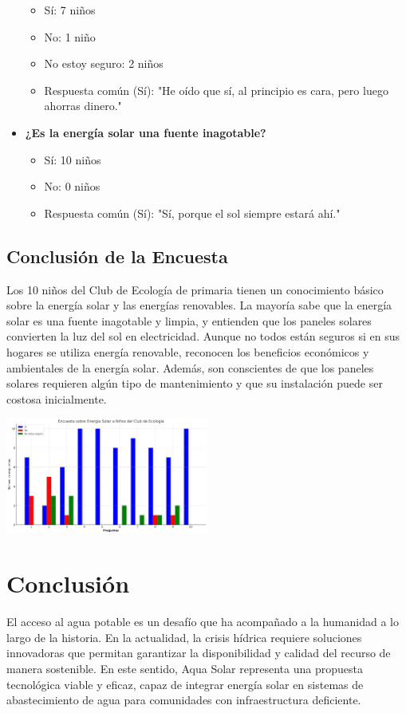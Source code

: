 \documentclass[12pt]{article}
\begin{document}
\begin{itemize}
            \begin{itemize}
                  \item Sí: 7 niños
                  \item No: 1 niño
                  \item No estoy seguro: 2 niños
                  \item Respuesta común (Sí): "He oído que sí, al principio es cara, pero luego ahorras dinero."
            \end{itemize}
      \item \textbf{¿Es la energía solar una fuente inagotable?}
            \begin{itemize}
                  \item Sí: 10 niños
                  \item No: 0 niños
                  \item Respuesta común (Sí): "Sí, porque el sol siempre estará ahí."
            \end{itemize}
\end{itemize}

\subsection{Conclusión de la Encuesta}
Los 10 niños del Club de Ecología de primaria tienen un conocimiento básico sobre la energía solar y las energías renovables. La mayoría sabe que la energía solar es una fuente inagotable y limpia, y entienden que los paneles solares convierten la luz del sol en electricidad. Aunque no todos están seguros si en sus hogares se utiliza energía renovable, reconocen los beneficios económicos y ambientales de la energía solar. Además, son conscientes de que los paneles solares requieren algún tipo de mantenimiento y que su instalación puede ser costosa inicialmente.




\begin{center}
      \includegraphics[width=0.5\textwidth]{imagenes/graph.png}
\end{center}
\newpage
\section{Conclusión}
El acceso al agua potable es un desafío que ha acompañado a la humanidad a lo largo de la historia. En la actualidad, la crisis hídrica requiere soluciones innovadoras que permitan garantizar la disponibilidad y calidad del recurso de manera sostenible. En este sentido, Aqua Solar representa una propuesta tecnológica viable y eficaz, capaz de integrar energía solar en sistemas de abastecimiento de agua para comunidades con infraestructura deficiente.
\end{document}
